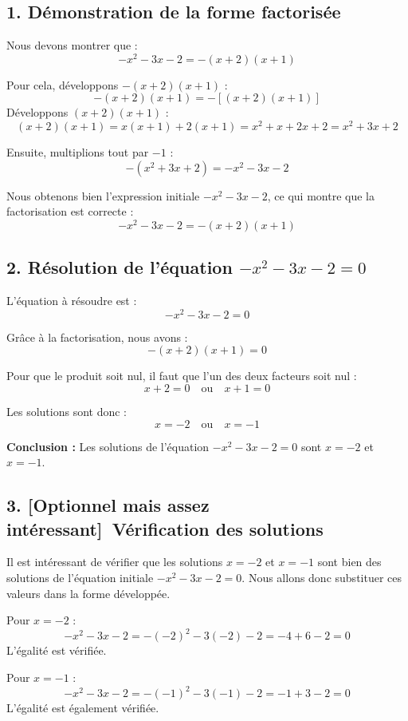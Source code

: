 \documentclass[a4paper,12pt]{article}
\begin{document}
    \subsection*{1. Démonstration de la forme factorisée}
    Nous devons montrer que :
    \[
    -x^2 - 3x - 2 = -(x + 2)(x + 1)
    \]
    
    Pour cela, développons \( -(x + 2)(x + 1) \) :
    \[
    -(x + 2)(x + 1) = -[(x + 2)(x + 1)]
    \]
    Développons \( (x + 2)(x + 1) \) :
    \[
    (x + 2)(x + 1) = x(x + 1) + 2(x + 1) = x^2 + x + 2x + 2 = x^2 + 3x + 2
    \]
    
    Ensuite, multiplions tout par \( -1 \) :
    \[
    -(x^2 + 3x + 2) = -x^2 - 3x - 2
    \]
    
    Nous obtenons bien l'expression initiale \( -x^2 - 3x - 2 \), ce qui montre que la factorisation est correcte :
    \[
    -x^2 - 3x - 2 = -(x + 2)(x + 1)
    \]
    
    \subsection*{2. Résolution de l'équation \( -x^2 - 3x - 2 = 0 \)}
    L'équation à résoudre est :
    \[
    -x^2 - 3x - 2 = 0
    \]
    
    Grâce à la factorisation, nous avons :
    \[
    -(x + 2)(x + 1) = 0
    \]
    
    Pour que le produit soit nul, il faut que l'un des deux facteurs soit nul :
    \[
    x + 2 = 0 \quad \text{ou} \quad x + 1 = 0
    \]
    
    Les solutions sont donc :
    \[
    x = -2 \quad \text{ou} \quad x = -1
    \]
    
    \textbf{Conclusion :} Les solutions de l'équation \( -x^2 - 3x - 2 = 0 \) sont \( x = -2 \) et \( x = -1 \).

    \subsection*{3. [Optionnel mais assez intéressant] Vérification des solutions}

    Il est intéressant de vérifier que les solutions \( x = -2 \) et \( x = -1 \) sont bien des solutions de l'équation initiale \( -x^2 - 3x - 2 = 0 \). Nous allons donc substituer ces valeurs dans la forme développée.

Pour \( x = -2 \) :
\[
-x^2 - 3x - 2 = -(-2)^2 - 3(-2) - 2 = -4 + 6 - 2 = 0
\]
L'égalité est vérifiée.

Pour \( x = -1 \) :
\[
-x^2 - 3x - 2 = -(-1)^2 - 3(-1) - 2 = -1 + 3 - 2 = 0
\]
L'égalité est également vérifiée.
\end{document}

